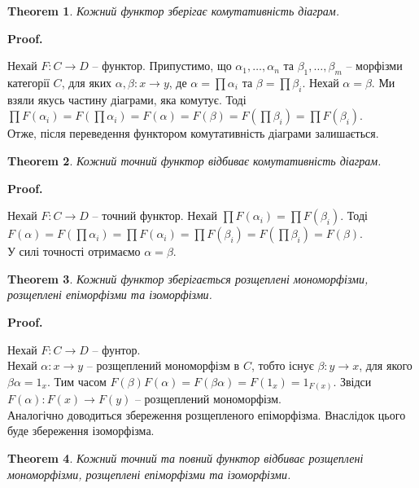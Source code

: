 \documentclass[a4paper, 10pt]{article}
\makeatletter
\theoremstyle{theoremdd}
\newtheorem{theorem}{Theorem}[subsection]
\renewenvironment{proof}[1][Proof.\\]{\par
\pushQED{\hfill \qed}%
\normalfont \topsep6\p@\@plus6\p@\relax
\trivlist
\item\relax
{\bfseries
#1\@addpunct{.}}\hspace\labelsep\ignorespaces
}{%
\popQED\endtrivlist\@endpefalse
}
\makeatother
\begin{document}
\begin{theorem}
Кожний функтор зберігає комутативність діаграм.
\end{theorem}

\begin{proof}
Нехай $F \colon C \to D$ -- функтор. Припустимо, що $\alpha_1,\dots,\alpha_n$ та $\beta_1,\dots,\beta_m$ -- морфізми категорії $C$, для яких $\alpha,\beta \colon x \to y$, де $\alpha = \displaystyle\prod \alpha_i$ та $\beta = \displaystyle\prod \beta_i$. Нехай $\alpha = \beta$. Ми взяли якусь частину діаграми, яка комутує. Тоді\\
$\displaystyle\prod F(\alpha_i) = F\left( \prod \alpha_i \right) = F(\alpha) = F(\beta) = F\left( \prod \beta_i \right) = \prod F(\beta_i)$.\\
Отже, після переведення функтором комутативність діаграми залишається.
\end{proof}

\begin{theorem}
Кожний точний функтор відбиває комутативність діаграм.
\end{theorem}

\begin{proof}
Нехай $F \colon C \to D$ -- точний функтор. Нехай $\displaystyle\prod F(\alpha_i) = \prod F(\beta_i)$. Тоді\\
$\displaystyle F(\alpha) = F\left( \prod \alpha_i \right) = \prod F(\alpha_i) = \prod F(\beta_i) = F\left( \prod \beta_i \right) = F(\beta)$.\\
У силі точності отримаємо $\alpha = \beta$.
\end{proof}

\begin{theorem}
Кожний функтор зберігається розщеплені мономорфізми, розщеплені епіморфізми та ізоморфізми.
\end{theorem}

\begin{proof}
Нехай $F \colon C \to D$ -- фунтор. \\
Нехай $\alpha \colon x \to y$ -- розщеплений мономорфізм в $C$, тобто існує $\beta \colon y \to x$, для якого $\beta \alpha = 1_x$. Тим часом $F(\beta) F(\alpha) = F(\beta \alpha) = F(1_x) = 1_{F(x)}$. Звідси $F(\alpha) \colon F(x) \to F(y)$ -- розщеплений мономорфізм. \\
Аналогічно доводиться збереження розщепленого епіморфізма. Внаслідок цього буде збереження ізоморфізма.
\end{proof}

\begin{theorem}
Кожний точний та повний функтор відбиває розщеплені мономорфізми, розщеплені епіморфізми та ізоморфізми.
\end{theorem}
\end{document}
